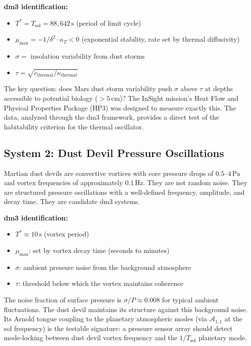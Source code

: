 \textbf{dm3 identification:}
\begin{itemize}
\item $T^* = T_{\text{sol}} = 88{,}642\,\mathrm{s}$ (period of limit cycle)
\item $\mu_{\max} = -1/\delta^2 \cdot \kappa_T < 0$ (exponential stability,
  rate set by thermal diffusivity)
\item $\sigma = $ insolation variability from dust storms
\item $\tau = \sqrt{c_\text{thermal}/\kappa_\text{thermal}}$
\end{itemize}

The key question: does Mars dust storm variability push $\sigma$ above
$\tau$ at depths accessible to potential biology ($> 5\,\mathrm{cm}$)?
The InSight mission's Heat Flow and Physical Properties Package (HP3)
was designed to measure exactly this. The data, analyzed through the
dm3 framework, provides a direct test of the habitability criterion
for the thermal oscillator.

\subsection{System 2: Dust Devil Pressure Oscillations}

Martian dust devils are convective vortices with core pressure drops
of $0.5$--$4\,\mathrm{Pa}$ and vortex frequencies of approximately
$0.1\,\mathrm{Hz}$. They are not random noise. They are structured
pressure oscillations with a well-defined frequency, amplitude, and
decay time. They are candidate dm3 systems.

\textbf{dm3 identification:}
\begin{itemize}
\item $T^* \approx 10\,\mathrm{s}$ (vortex period)
\item $\mu_{\max}$: set by vortex decay time (seconds to minutes)
\item $\sigma$: ambient pressure noise from the background atmosphere
\item $\tau$: threshold below which the vortex maintains coherence
\end{itemize}

The noise fraction of surface pressure is $\sigma/P \approx 0.008$
for typical ambient fluctuations. The dust devil maintains its
structure against this background noise. Its Arnold tongue coupling
to the planetary atmospheric modes (via $\mathcal{A}_{1:1}$ at the
sol frequency) is the testable signature: a pressure sensor array
should detect mode-locking between dust devil vortex frequency and
the $1/T_{\text{sol}}$ planetary mode.

